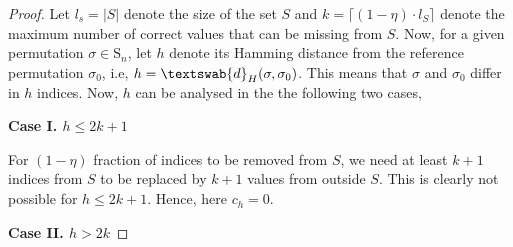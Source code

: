 \begin{proof} Let $l_s=|S|$ denote the size of the set $S$ and $k=\lceil (1-\eta)\cdot l_S\rceil$ denote the maximum number of correct values that can be missing from $S$. Now, for a given permutation $\sigma \in \mathrm{S}_n$, let $h$ denote its Hamming distance from the reference permutation $\sigma_0$, i.e, $h=\textswab{d}_H(\sigma,\sigma_0)$. This means that $\sigma$ and $\sigma_0$ differ in $h$ indices.  Now, $h$ can be analysed in the  the following two cases, 
\par
\textbf{Case I. $h\leq 2k+1$}

For $(1-\eta)$ fraction of indices to be removed from $S$, we need at least $k+1$ indices from $S$ to be replaced by $k+1$ values from outside $S$. This is clearly not possible for $h\leq 2k+1$. Hence, here $c_h=0$. 
\par
\textbf{Case II. $h > 2k$}


\end{proof}
